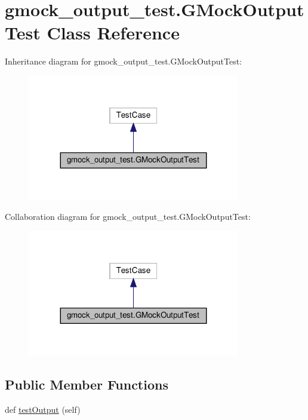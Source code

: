 \hypertarget{classgmock__output__test_1_1_g_mock_output_test}{}\section{gmock\+\_\+output\+\_\+test.\+G\+Mock\+Output\+Test Class Reference}
\label{classgmock__output__test_1_1_g_mock_output_test}


Inheritance diagram for gmock\+\_\+output\+\_\+test.\+G\+Mock\+Output\+Test\+:
\nopagebreak
\begin{figure}[H]
\begin{center}
\leavevmode
\includegraphics[width=263pt]{classgmock__output__test_1_1_g_mock_output_test__inherit__graph}
\end{center}
\end{figure}


Collaboration diagram for gmock\+\_\+output\+\_\+test.\+G\+Mock\+Output\+Test\+:
\nopagebreak
\begin{figure}[H]
\begin{center}
\leavevmode
\includegraphics[width=263pt]{classgmock__output__test_1_1_g_mock_output_test__coll__graph}
\end{center}
\end{figure}
\subsection*{Public Member Functions}
\begin{DoxyCompactItemize}
\item 
def \hyperlink{classgmock__output__test_1_1_g_mock_output_test_a661e7846690f48328fd9e0834fde9980}{test\+Output} (self)
\end{DoxyCompactItemize}


